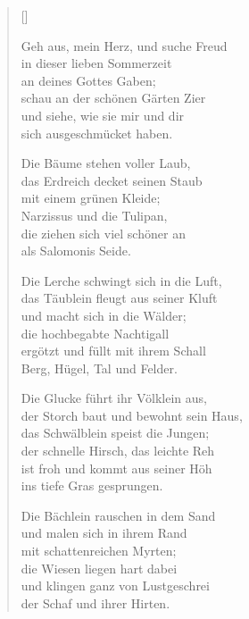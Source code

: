 \begin{multicols}{2}
\settowidth{\versewidth}{Die Lerche schwingt sich in die Luft,}
\begin{verse}[\versewidth]

 Geh aus, mein Herz, und suche Freud\\
in dieser lieben Sommerzeit\\
an deines Gottes Gaben;\\
schau an der schönen Gärten Zier\\
und siehe, wie sie mir und dir\\
sich ausgeschmücket haben.

 Die Bäume stehen voller Laub,\\
das Erdreich decket seinen Staub\\
mit einem grünen Kleide;\\
Narzissus und die Tulipan,\\
die ziehen sich viel schöner an\\
als Salomonis Seide.

 Die Lerche schwingt sich in die Luft,\\
das Täublein fleugt aus seiner Kluft\\
und macht sich in die Wälder;\\
die hochbegabte Nachtigall\\
ergötzt und füllt mit ihrem Schall\\
Berg, Hügel, Tal und Felder.

 Die Glucke führt ihr Völklein aus,\\
der Storch baut und bewohnt sein Haus,\\
das Schwälblein speist die Jungen;\\
der schnelle Hirsch, das leichte Reh\\
ist froh und kommt aus seiner Höh\\
ins tiefe Gras gesprungen.

 Die Bächlein rauschen in dem Sand\\
und malen sich in ihrem Rand\\
mit schattenreichen Myrten;\\
die Wiesen liegen hart dabei\\
und klingen ganz von Lustgeschrei\\
der Schaf und ihrer Hirten.


\end{verse}
\end{multicols}
